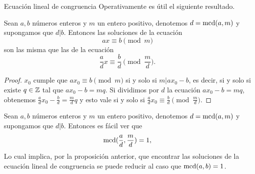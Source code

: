 \begin{section}{Ecuación lineal de congruencia}
Operativamente es útil el siguiente resultado. 

\begin{proposicion}\label{proposicion-elc-simplificada}
    Sean $a,b$ números enteros y $m$ un entero positivo, denotemos $d = \operatorname{mcd}(a,m)$ y supongamos que $d|b$. Entonces las soluciones de la ecuación
    \begin{equation*}
        ax \equiv b \pmod{m}
    \end{equation*}
    son las misma que las de la ecuación
    \begin{equation*}
        \frac{a}{d} x \equiv \frac{b}{d} \pmod{\frac{m}{d}}.
    \end{equation*}
\end{proposicion}
\begin{proof}
    $x_0$ cumple que $ax_0 \equiv b \pmod{m}$ si y solo si $m | ax_0 - b$,  es decir, si y solo si existe $q \in {\mathbb Z}$  tal que $ ax_0 - b = mq$. Si dividimos por $d$ la ecuación $ ax_0 - b = mq$, obtenemos $\displaystyle\frac{a}{d} x_0 - \frac{b}{d}  = {\frac{m}{d}}q$ y esto vale si y solo si  $\displaystyle\frac{a}{d} x_0 \equiv \frac{b}{d} \pmod{\frac{m}{d}}$.
\end{proof}

\begin{observacion*}
    Sean $a,b$ números enteros y $m$ un entero positivo, denotemos $d = \operatorname{mcd}(a,m)$ y supongamos que $d|b$. Entonces es fácil ver que 
    \begin{equation*}
        \operatorname{mcd}(\frac{a}{d},\frac{m}{d}) = 1,
    \end{equation*}
    Lo cual implica, por la proposición anterior, que encontrar las soluciones de la ecuación lineal de congruencia se puede reducir al caso que $\operatorname{mcd}(a,b) =1$.
\end{observacion*}





\end{section}
